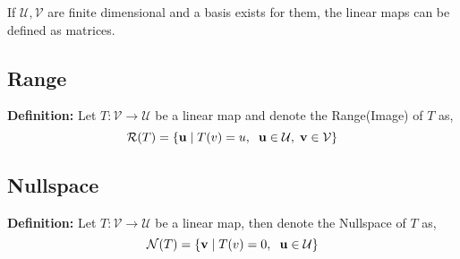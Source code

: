 \documentclass[a4paper]{article}
\begin{document}
If $\mathcal{U,V}$ are finite dimensional and a basis exists for them, the linear maps can be defined as matrices.

\subsection{Range}
\textbf{Definition:} Let $T: \mathcal{V}\rightarrow\mathcal{U}$ be a linear map and denote the Range(Image) of $T$ as,
$$
\mathcal{R}(T) = \{\mathbf{u}\mid T(v) = u,\hspace{2mm} \mathbf{u}\in\mathcal{U},\hspace{1mm}\mathbf{v}\in\mathcal{V}\}
$$


\subsection{Nullspace}
\textbf{Definition:} Let $T: \mathcal{V}\rightarrow\mathcal{U}$ be a linear map, then denote the Nullspace of $T$ as,
$$
\mathcal{N}(T) = \{\mathbf{v}\mid T(v) = 0,\hspace{2mm}\mathbf{u}\in\mathcal{U}\}
$$

\end{document}

